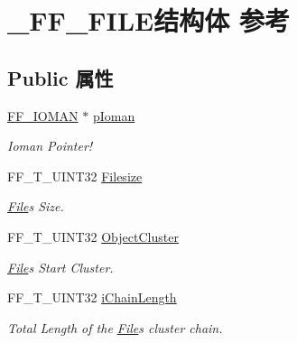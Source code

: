 \hypertarget{struct___f_f___f_i_l_e}{}\section{\+\_\+\+F\+F\+\_\+\+F\+I\+L\+E结构体 参考}
\label{struct___f_f___f_i_l_e}
\subsection*{Public 属性}
\begin{DoxyCompactItemize}
\item 
\mbox{\label{struct___f_f___f_i_l_e_ae39143ae1d33d4faecc44dd563b592a1}} 
\hyperlink{struct_f_f___i_o_m_a_n}{F\+F\+\_\+\+I\+O\+M\+AN} $\ast$ \hyperlink{struct___f_f___f_i_l_e_ae39143ae1d33d4faecc44dd563b592a1}{p\+Ioman}
\begin{DoxyCompactList}\small\item\em Ioman Pointer! \end{DoxyCompactList}\item 
\mbox{\label{struct___f_f___f_i_l_e_a85ddeade005d95f96d41aafbdbb22d83}} 
F\+F\+\_\+\+T\+\_\+\+U\+I\+N\+T32 \hyperlink{struct___f_f___f_i_l_e_a85ddeade005d95f96d41aafbdbb22d83}{Filesize}
\begin{DoxyCompactList}\small\item\em \hyperlink{class_file}{File}\textquotesingle{}s Size. \end{DoxyCompactList}\item 
\mbox{\label{struct___f_f___f_i_l_e_af0182afb483d3fc0ed0d8d939cacd2c0}} 
F\+F\+\_\+\+T\+\_\+\+U\+I\+N\+T32 \hyperlink{struct___f_f___f_i_l_e_af0182afb483d3fc0ed0d8d939cacd2c0}{Object\+Cluster}
\begin{DoxyCompactList}\small\item\em \hyperlink{class_file}{File}\textquotesingle{}s Start Cluster. \end{DoxyCompactList}\item 
\mbox{\label{struct___f_f___f_i_l_e_ac53bcf692821ade6bb663a945ba5ef0b}} 
F\+F\+\_\+\+T\+\_\+\+U\+I\+N\+T32 \hyperlink{struct___f_f___f_i_l_e_ac53bcf692821ade6bb663a945ba5ef0b}{i\+Chain\+Length}
\begin{DoxyCompactList}\small\item\em Total Length of the \hyperlink{class_file}{File}\textquotesingle{}s cluster chain. \end{DoxyCompactList}\item 

\end{DoxyCompactItemize}
